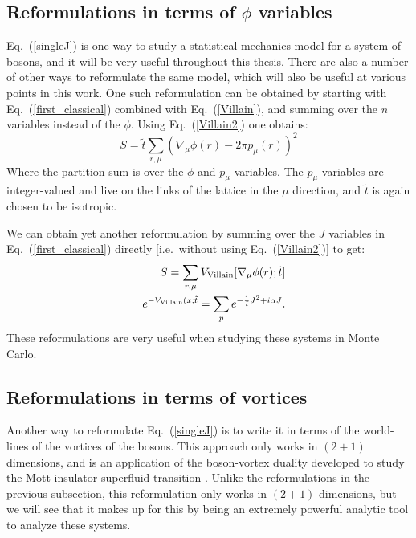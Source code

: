 \subsection{Reformulations in terms of $\phi$ variables}
Eq.~(\ref{singleJ}) is one way to study a statistical mechanics model for a system of bosons, and it will be very useful throughout this thesis. There are also a number of other ways to reformulate the same model, which will also be useful at various points in this work. One such reformulation can be obtained by starting with Eq.~(\ref{first_classical}) combined with Eq.~(\ref{Villain}), and summing over the $n$ variables instead of the $\phi$. Using Eq.~(\ref{Villain2}) one obtains:
\begin{equation}
S=\tilde t \sum_{r,\mu} (\nabla_\mu \phi(r)-2\pi p_\mu(r))^2
\label{singleRods}
\end{equation}
Where the partition sum is over the $\phi$ and $p_\mu$ variables. The $p_\mu$ variables are integer-valued and live on the links of the lattice in the $\mu$ direction, and $\tilde t$ is again chosen to be isotropic. 

We can obtain yet another reformulation by summing over the $J$ variables in Eq.~(\ref{first_classical}) directly [i.e.~without using Eq.~(\ref{Villain2})] to get:
\begin{eqnarray}
&&S=\sum_{r,\mu} V_{\rm Villain} [\nabla_\mu \phi(r);\tilde t]\nonumber\\
&&e^{-V_{\rm Villain}(x;\tilde t}=\sum_{p} e^{-\frac{1}{\tilde t} J^2+i\alpha J}.
\label{singleVillain}
\end{eqnarray}
These reformulations are very useful when studying these systems in Monte Carlo.

\subsection{Reformulations in terms of vortices}
\label{subsec::JtoQ}
Another way to reformulate Eq.~(\ref{singleJ}) is to write it in terms of the world-lines of the vortices of the bosons. This approach only works in $(2+1)$ dimensions, and is an application of the boson-vortex duality developed to study the Mott insulator-superfluid transition\cite{PolyakovBook, Peskin1978, Dasgupta1981, FisherLee1989, LeeFisher1989, artphoton,short_range3} . Unlike the reformulations in the previous subsection, this reformulation only works in $(2+1)$ dimensions, but we will see that it makes up for this by being an extremely powerful analytic tool to analyze these systems. 

